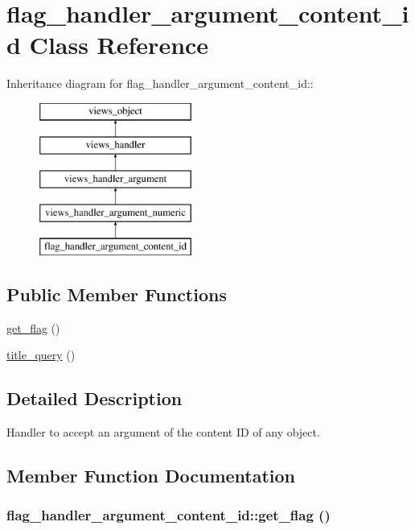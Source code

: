 \hypertarget{classflag__handler__argument__content__id}{
\section{flag\_\-handler\_\-argument\_\-content\_\-id Class Reference}
\label{classflag__handler__argument__content__id}
}
Inheritance diagram for flag\_\-handler\_\-argument\_\-content\_\-id::\begin{figure}[H]
\begin{center}
\leavevmode
\includegraphics[height=5cm]{classflag__handler__argument__content__id}
\end{center}
\end{figure}
\subsection*{Public Member Functions}
\begin{CompactItemize}
\item 
\hyperlink{classflag__handler__argument__content__id_68a7b2f7fca11605ee77bf795deef73f}{get\_\-flag} ()
\item 
\hyperlink{classflag__handler__argument__content__id_d4164484998d7e2eff1a1cb233189384}{title\_\-query} ()
\end{CompactItemize}


\subsection{Detailed Description}
Handler to accept an argument of the content ID of any object. 

\subsection{Member Function Documentation}
\hypertarget{classflag__handler__argument__content__id_68a7b2f7fca11605ee77bf795deef73f}{
\subsubsection[{get\_\-flag}]{\setlength{\rightskip}{0pt plus 5cm}flag\_\-handler\_\-argument\_\-content\_\-id::get\_\-flag ()}}
\label{classflag__handler__argument__content__id_68a7b2f7fca11605ee77bf795deef73f}


